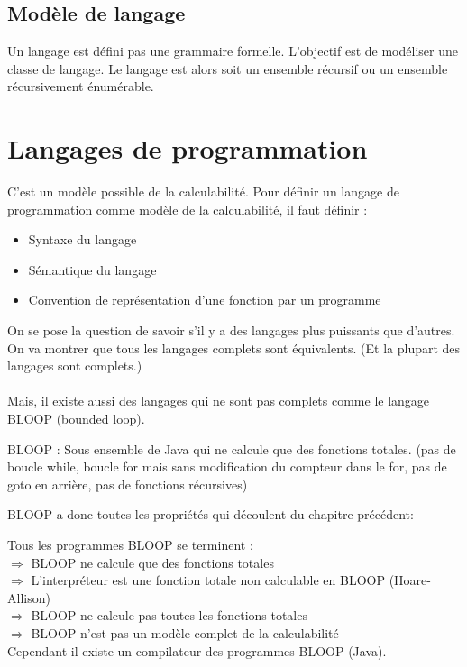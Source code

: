 \subsection{Modèle de langage}
\label{ssub:mod_le_de_langage}
Un langage est défini pas une grammaire formelle. L'objectif est de modéliser
une classe de langage. Le langage est alors soit un ensemble récursif ou un
ensemble récursivement énumérable.


\section{Langages de programmation}
\label{sub:langages_de_programmation}
C'est un modèle possible de la calculabilité. Pour définir un langage de
programmation comme modèle de la calculabilité, il faut définir :
\begin{itemize}
	\item Syntaxe du langage
	\item Sémantique du langage
	\item Convention de représentation d'une fonction par un programme
\end{itemize}

On se pose la question de savoir s'il y a des langages plus puissants que
d'autres. On va montrer que tous les langages complets sont équivalents. (Et la
plupart des langages sont complets.)

\paragraph{} Mais, il existe aussi des langages qui ne sont pas complets comme le
langage BLOOP (bounded loop).

\begin{mydef}
	BLOOP : Sous ensemble de Java qui ne calcule que des fonctions totales.
	(pas de boucle while, boucle for mais sans modification du compteur
	dans le for, pas de goto en arrière, pas de fonctions récursives)
\end{mydef}

BLOOP a donc toutes les propriétés qui découlent du chapitre précédent:

\begin{myprop}
Tous les programmes BLOOP se terminent :\\
	$ \Rightarrow$ BLOOP ne calcule que des fonctions totales\\
    $ \Rightarrow$ L'interpréteur est une fonction totale non calculable en
BLOOP (Hoare-Allison)\\
	$ \Rightarrow$ BLOOP ne calcule pas toutes les fonctions totales\\
    $ \Rightarrow$ BLOOP n'est pas un modèle complet de la calculabilité\\
    
Cependant il existe un compilateur des programmes BLOOP (Java).\\
\end{myprop}

